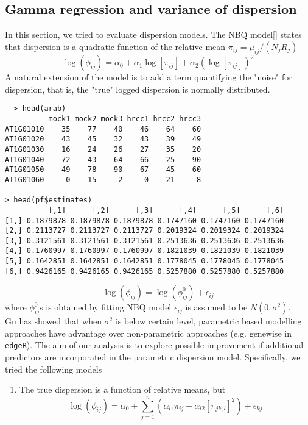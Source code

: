 \documentclass[paper=a4, fontsize=12.5pt]{scrartcl} %
\numberwithin{equation}{section} %
\numberwithin{figure}{section} %
\numberwithin{table}{section} %
\begin{document}
   \subsection{Gamma regression and variance of dispersion}
       In this section, we tried to evaluate dispersion models. The NBQ model[{\color{green}{reference}}] states that dispersion is a quadratic function of the relative mean $\pi_{ij}=\mu_{ij}/(N_jR_j)$
   \[\log(\phi_{ij})= \alpha_0 + \alpha_1\log[\pi_{ij}] + \alpha_2(\log[\pi_{ij}])^2\]
  A natural extension of the model is to add a term quantifying the "noise" for dispersion, that is, the "true" logged dispersion is normally distributed. 
  \begin{verbatim}
  > head(arab)
          mock1 mock2 mock3 hrcc1 hrcc2 hrcc3
AT1G01010    35    77    40    46    64    60
AT1G01020    43    45    32    43    39    49
AT1G01030    16    24    26    27    35    20
AT1G01040    72    43    64    66    25    90
AT1G01050    49    78    90    67    45    60
AT1G01060     0    15     2     0    21     8

> head(pf$estimates)
          [,1]      [,2]      [,3]      [,4]      [,5]      [,6]
[1,] 0.1879878 0.1879878 0.1879878 0.1747160 0.1747160 0.1747160
[2,] 0.2113727 0.2113727 0.2113727 0.2019324 0.2019324 0.2019324
[3,] 0.3121561 0.3121561 0.3121561 0.2513636 0.2513636 0.2513636
[4,] 0.1760997 0.1760997 0.1760997 0.1821039 0.1821039 0.1821039
[5,] 0.1642851 0.1642851 0.1642851 0.1778045 0.1778045 0.1778045
[6,] 0.9426165 0.9426165 0.9426165 0.5257880 0.5257880 0.5257880
  \end{verbatim}
  \[\log(\phi_{ij})= \log(\phi^0_{ij})+ \epsilon_{ij}\]
  where $\phi^0_{ij}$s is obtained by fitting NBQ model $\epsilon_{ij}$ is assumed to be $N(0, \sigma^2)$. \\
  
   Gu has showed that  when $\sigma^2$ is below certain level, parametric based modelling approaches have advantage over non-parametric approaches (e.g. genewise in \verb"edgeR"). The aim of our analysis is to explore possible improvement if additional predictors are incorporated in the parametric dispersion model. Specifically, we tried the following models
   \begin{enumerate}
   \item The true dispersion is a function of relative means, but 
   \[\log(\phi_{ij})= \alpha_0 + \sum_{j=1}^n(\alpha_{l1}\pi_{ij} + \alpha_{l2}[\pi_{jk, l}]^2) + \epsilon_{kj} \]
   \end{enumerate}
\end{document}

